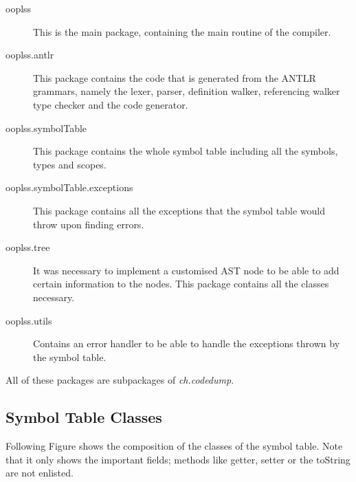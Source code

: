 \begin{description}
\item[ooplss] This is the main package, containing the main routine of the 
compiler.
\item[ooplss.antlr] This package contains the code that is generated from the 
ANTLR grammars, namely the lexer, parser, definition walker, referencing walker
type checker and the code generator.
\item[ooplss.symbolTable] This package contains the whole symbol table including
all the symbols, types and scopes.
\item[ooplss.symbolTable.exceptions] This package contains all the exceptions 
that the symbol table would throw upon finding errors.
\item[ooplss.tree] It was necessary to implement a customised AST node to be 
able to add certain information to the nodes. This package contains all the 
classes necessary.
\item[ooplss.utils] Contains an error handler to be able to handle the
exceptions thrown by the symbol table.
\end{description}

All of these packages are subpackages of \emph{ch.codedump}.

\subsection{Symbol Table Classes}

Following Figure shows the composition of the classes of the symbol table.
Note that it only shows the important fields; methods like getter, setter or 
the toString are not enlisted.

